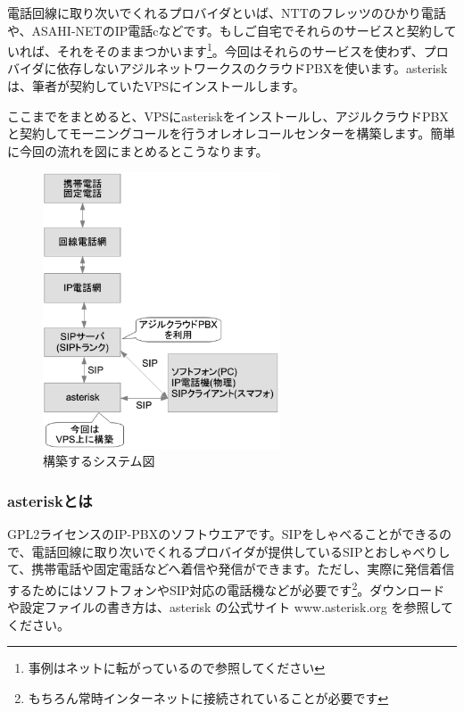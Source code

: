 電話回線に取り次いでくれるプロバイダといば、NTTのフレッツのひかり電話や、ASAHI-NETのIP電話cなどです。もしご自宅でそれらのサービスと契約していれば、それをそのままつかいます\footnote{事例はネットに転がっているので参照してください}。今回はそれらのサービスを使わず、プロバイダに依存しないアジルネットワークスのクラウドPBXを使います。asteriskは、筆者が契約していたVPSにインストールします。

ここまでをまとめると、VPSにasteriskをインストールし、アジルクラウドPBXと契約してモーニングコールを行うオレオレコールセンターを構築します。簡単に今回の流れを図にまとめるとこうなります。

\begin{figure}[htbp]
 \begin{center}
  \includegraphics[width=70mm]{tboffice-asterisk/img/gaiyou.eps}
 \end{center}
 \caption{構築するシステム図}
 \label{fig:gaiyou}
\end{figure}

\subsubsection{asteriskとは}
GPL2ライセンスのIP-PBXのソフトウエアです。SIPをしゃべることができるので、電話回線に取り次いでくれるプロバイダが提供しているSIPとおしゃべりして、携帯電話や固定電話などへ着信や発信ができます。ただし、実際に発信着信するためにはソフトフォンやSIP対応の電話機などが必要です\footnote{もちろん常時インターネットに接続されていることが必要です}。ダウンロードや設定ファイルの書き方は、asterisk の公式サイト www.asterisk.org を参照してください。

